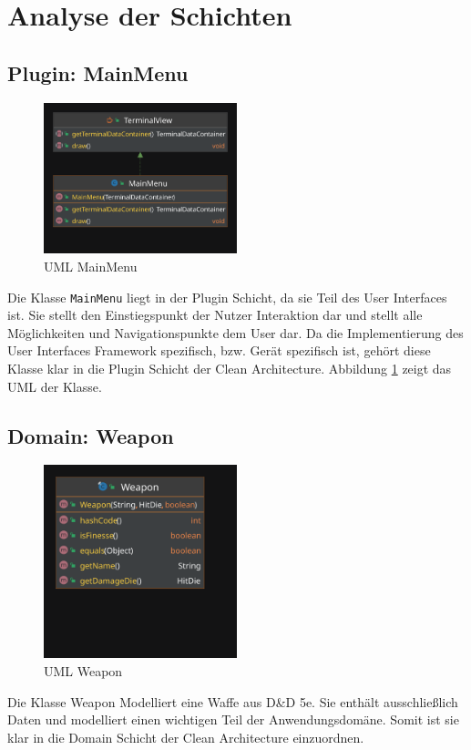 \section{Analyse der Schichten}

\subsection{Plugin: MainMenu}
\begin{figure}[H]
	\centering
	\includegraphics[width=0.5\textwidth]{Bilder/MainMenu.pdf}
	\caption{UML MainMenu}
	\label{fig:MainMenu}
\end{figure}

Die Klasse \texttt{MainMenu} liegt in der Plugin Schicht, da sie Teil des User Interfaces ist. Sie stellt den Einstiegspunkt der Nutzer Interaktion dar und stellt alle Möglichkeiten und Navigationspunkte dem User dar. Da die Implementierung des User Interfaces Framework spezifisch, bzw. Gerät spezifisch ist, gehört diese Klasse klar in die Plugin Schicht der Clean Architecture. Abbildung \ref{fig:MainMenu} zeigt das UML der Klasse.

\subsection{Domain: Weapon}
\begin{figure}[H]
	\centering
	\includegraphics[width=0.5\textwidth]{Bilder/Weapon.pdf}
	\caption{UML Weapon}
	\label{fig:Weapon}
\end{figure}
Die Klasse Weapon Modelliert eine Waffe aus D\&D 5e. Sie enthält ausschließlich Daten und modelliert einen wichtigen Teil der Anwendungsdomäne. Somit ist sie klar in die Domain Schicht der Clean Architecture einzuordnen.
